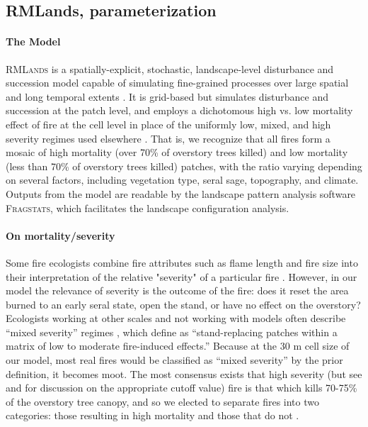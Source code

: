 \documentclass[12pt]{article}
\begin{document}
\begin{spacing}{1}
\subsection*{RMLands, parameterization}

\paragraph{The Model}
\textsc{RMLands} is a spatially-explicit, stochastic, landscape-level disturbance and succession model capable of simulating fine-grained processes over large spatial and long temporal extents \citep{McGarigal2005}. It is grid-based but simulates disturbance and succession at the patch level, and employs a dichotomous high vs. low mortality effect of fire at the cell level in place of the uniformly low, mixed, and high severity regimes used elsewhere \citep{Mcgarigal2012}. That is, we recognize that all fires form a mosaic of high mortality (over 70\% of overstory trees killed) and low mortality (less than 70\% of overstory trees killed) patches, with the ratio varying depending on several factors, including vegetation type, seral sage, topography, and climate. Outputs from the model are readable by the landscape pattern analysis software \textsc{Fragstats}, which facilitates the landscape configuration analysis. 


\paragraph{On mortality/severity}
Some fire ecologists combine fire attributes such as flame length and fire size into their interpretation of the relative "severity" of a particular fire \citep{Agee1993}. However, in our model the relevance of severity is the outcome of the fire: does it reset the area burned to an early seral state, open the stand, or have no effect on the overstory?  Ecologists working at other scales and not working with models often describe ``mixed severity'' regimes \citep[e.g.,]{Kane2013}, which \citet{Collins2010} define as ``stand-replacing patches within a matrix of low to moderate fire-induced effects.'' Because at the 30 m cell size of our model, most real fires would be classified as ``mixed severity'' by the prior definition, it becomes moot. The most consensus exists that high severity (but see \citep{Fule2014} and \citep{Mallek2013} for discussion on the appropriate cutoff value) fire is that which kills 70-75\% of the overstory tree canopy, and so we elected to separate fires into two categories: those resulting in high mortality and those that do not \citep{Miller2009, Baker2014}.


\end{spacing}
\end{document}
